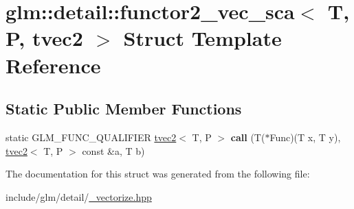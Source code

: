 \hypertarget{structglm_1_1detail_1_1functor2__vec__sca_3_01T_00_01P_00_01tvec2_01_4}{}\section{glm\+:\+:detail\+:\+:functor2\+\_\+vec\+\_\+sca$<$ T, P, tvec2 $>$ Struct Template Reference}
\label{structglm_1_1detail_1_1functor2__vec__sca_3_01T_00_01P_00_01tvec2_01_4}
\subsection*{Static Public Member Functions}
\begin{DoxyCompactItemize}
\item 
\mbox{\label{structglm_1_1detail_1_1functor2__vec__sca_3_01T_00_01P_00_01tvec2_01_4_ad640cc49fdd9c6451bff02195a618c55}} 
static G\+L\+M\+\_\+\+F\+U\+N\+C\+\_\+\+Q\+U\+A\+L\+I\+F\+I\+ER \hyperlink{structglm_1_1tvec2}{tvec2}$<$ T, P $>$ {\bfseries call} (T($\ast$Func)(T x, T y), \hyperlink{structglm_1_1tvec2}{tvec2}$<$ T, P $>$ const \&a, T b)
\end{DoxyCompactItemize}


The documentation for this struct was generated from the following file\+:\begin{DoxyCompactItemize}
\item 
include/glm/detail/\hyperlink{__vectorize_8hpp}{\+\_\+vectorize.\+hpp}\end{DoxyCompactItemize}
